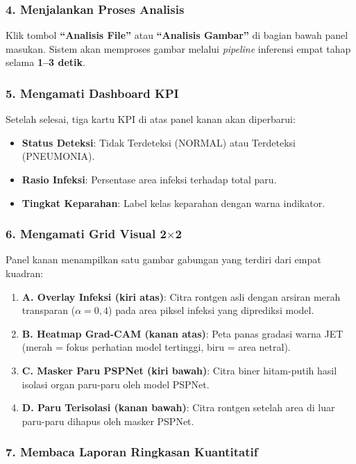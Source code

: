 \documentclass[12pt,a4paper]{article}
\begin{document}
\subsubsection{4. Menjalankan Proses Analisis}

Klik tombol \textbf{``Analisis File''} atau \textbf{``Analisis Gambar''}
di bagian bawah panel masukan. Sistem akan memproses gambar melalui
\textit{pipeline} inferensi empat tahap selama \textbf{1--3 detik}.

\subsubsection{5. Mengamati Dashboard KPI}

Setelah selesai, tiga kartu KPI di atas panel kanan akan diperbarui:
\begin{itemize}
    \item \textbf{Status Deteksi}: Tidak Terdeteksi (NORMAL) atau Terdeteksi (PNEUMONIA).
    \item \textbf{Rasio Infeksi}: Persentase area infeksi terhadap total paru.
    \item \textbf{Tingkat Keparahan}: Label kelas keparahan dengan warna indikator.
\end{itemize}

\subsubsection{6. Mengamati Grid Visual 2$\times$2}

Panel kanan menampilkan satu gambar gabungan yang terdiri dari empat kuadran:
\begin{enumerate}
    \item \textbf{A. Overlay Infeksi (kiri atas)}: Citra rontgen asli dengan
    arsiran merah transparan ($\alpha=0{,}4$) pada area piksel infeksi yang
    diprediksi model.
    \item \textbf{B. Heatmap Grad-CAM (kanan atas)}: Peta panas gradasi warna
    JET (merah = fokus perhatian model tertinggi, biru = area netral).
    \item \textbf{C. Masker Paru PSPNet (kiri bawah)}: Citra biner hitam-putih
    hasil isolasi organ paru-paru oleh model PSPNet.
    \item \textbf{D. Paru Terisolasi (kanan bawah)}: Citra rontgen setelah area
    di luar paru-paru dihapus oleh masker PSPNet.
\end{enumerate}

\subsubsection{7. Membaca Laporan Ringkasan Kuantitatif}
\end{document}
